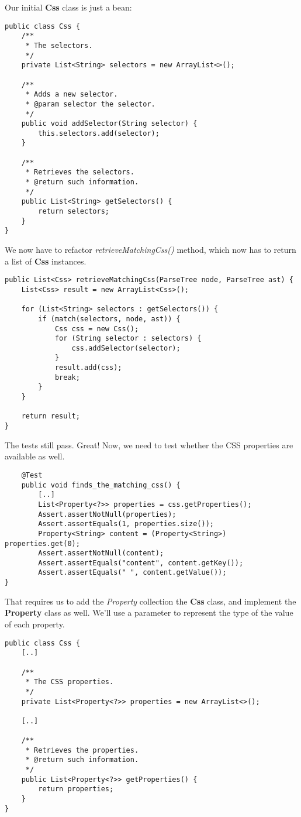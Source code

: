 \documentclass[11pt]{article}
\begin{document}
Our initial \textbf{Css} class is just a bean:

\begin{verbatim}
public class Css {
    /**
     * The selectors.
     */
    private List<String> selectors = new ArrayList<>();

    /**
     * Adds a new selector.
     * @param selector the selector.
     */
    public void addSelector(String selector) {
        this.selectors.add(selector);
    }

    /**
     * Retrieves the selectors.
     * @return such information.
     */
    public List<String> getSelectors() {
        return selectors;
    }
}
\end{verbatim}

We now have to refactor \emph{retrieveMatchingCss()} method, which now has to return a list
of \textbf{Css} instances.

\begin{verbatim}
public List<Css> retrieveMatchingCss(ParseTree node, ParseTree ast) {
    List<Css> result = new ArrayList<Css>();

    for (List<String> selectors : getSelectors()) {
        if (match(selectors, node, ast)) {
            Css css = new Css();
            for (String selector : selectors) {
                css.addSelector(selector);
            }
            result.add(css);
            break;
        }
    }

    return result;
}
\end{verbatim}

The tests still pass. Great! Now, we need to test whether the CSS properties are available as well.

\begin{verbatim}
    @Test
    public void finds_the_matching_css() {
        [..]
        List<Property<?>> properties = css.getProperties();
        Assert.assertNotNull(properties);
        Assert.assertEquals(1, properties.size());
        Property<String> content = (Property<String>) properties.get(0);
        Assert.assertNotNull(content);
        Assert.assertEquals("content", content.getKey());
        Assert.assertEquals(" ", content.getValue());
}
\end{verbatim}

That requires us to add the \emph{Property} collection the \textbf{Css} class, and implement the \textbf{Property} class as well.
We'll use a parameter to represent the type of the value of each property.

\begin{verbatim}
public class Css {
    [..]

    /**
     * The CSS properties.
     */
    private List<Property<?>> properties = new ArrayList<>();

    [..]

    /**
     * Retrieves the properties.
     * @return such information.
     */
    public List<Property<?>> getProperties() {
        return properties;
    }
}
\end{verbatim}
\end{document}
